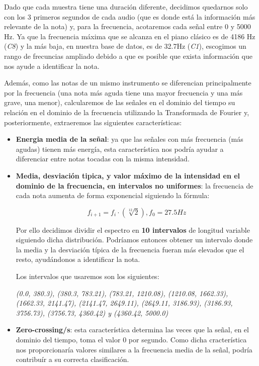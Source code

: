 \documentclass[12pt]{article}
\begin{document}
\bigskip
Dado que cada muestra tiene una duración diferente, decidimos quedarnos solo con los 3 primeros segundos de cada audio (que es donde está la información más
relevante de la nota) y, para la frecuencia, acotaremos cada señal entre 0 y 5000 Hz. Ya que la frecuencia máxima que se alcanza en el 
piano clásico es de 4186 Hz (\textit{C8}) y la más baja, en nuestra base de datos, es de 32.7Hz (\textit{C1}), escogimos un rango
de frecuncias ampliado debido a que es posible que exista información que nos ayude a identificar la nota.

\bigskip
Además, como las notas de un mismo instrumento se diferencian principalmente por la frecuencia (una nota más aguda tiene una mayor frecuencia
y una más grave, una menor), calcularemos de las señales en el dominio del tiempo su relación en el dominio de la frecuencia utilizando la
Transformada de Fourier y, posteriormente, extraeremos las siguientes características:
\begin{itemize}
	\item \textbf{Energia media de la señal}: ya que las señales con más frecuencia (más agudas) tienen más energía, esta característica nos podría
		ayudar a diferenciar entre notas tocadas con la misma intensidad.
	\item \textbf{Media, desviación tipica, y valor máximo de la intensidad en el dominio de la frecuencia, en intervalos no uniformes}: la frecuencia de cada nota
		aumenta de forma exponencial siguiendo la fórmula:

		\begin{equation}
			f_{i+1} = f_{i}\cdot(\sqrt[12]{2}), f_0 = 27.5 Hz
		\end{equation}

		Por ello decidimos dividir el espectro en \textbf{10 intervalos} de longitud variable siguiendo dicha distribución. 
		Podríamos entonces obtener un intervalo donde la media y la desviación típica de la frecuencia fueran más elevados que el resto,
		ayudándonos a identificar la nota.
		
		Los intervalos que usaremos son los siguientes:
		
		\textit{(0.0, 380.3), (380.3, 783.21), (783.21, 1210.08), (1210.08, 1662.33),\newline
		(1662.33, 2141.47), (2141.47, 2649.11), (2649.11, 3186.93), (3186.93, 3756.73), 
		(3756.73, 4360.42) y (4360.42, 5000.0)}
	\item \textbf{Zero-crossing/s}: esta característica determina las veces que la señal, en el dominio del tiempo, toma el valor 0 por segundo.
		Como dicha cracterística nos proporcionaría valores similares a la frecuencia media de la señal, podría contribuír a su correcta clasificación.
\end{itemize}
\end{document}
